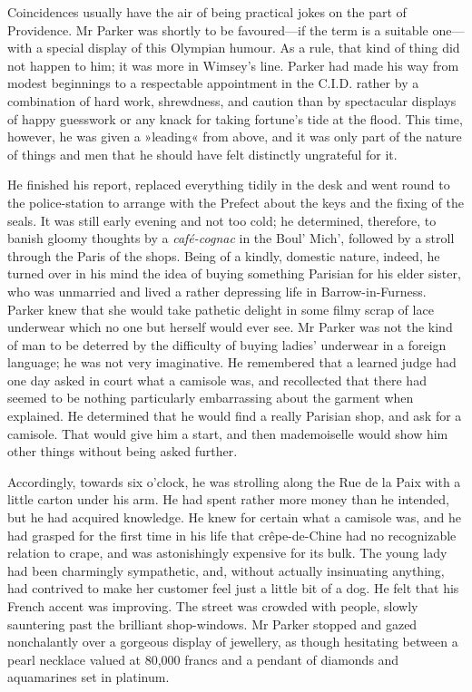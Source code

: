 Coincidences usually have the air of being practical jokes on the part of Providence. Mr Parker was shortly to be favoured\allowbreak---\allowbreak if the term is a suitable one\allowbreak---\allowbreak with a special display of this Olympian humour. As a rule, that kind of thing did not happen to him; it was more in Wimsey's line. Parker had made his way from modest beginnings to a respectable appointment in the C.I.D. rather by a combination of hard work, shrewdness, and caution than by spectacular displays of happy guesswork or any knack for taking fortune's tide at the flood. This time, however, he was given a »leading« from above, and it was only part of the nature of things and men that he should have felt distinctly ungrateful for it.

He finished his report, replaced everything tidily in the desk and went round to the police-station to arrange with the Prefect about the keys and the fixing of the seals. It was still early evening and not too cold; he determined, therefore, to banish gloomy thoughts by a \foreignlanguage{french}{\textit{café-cognac}} in the Boul' Mich', followed by a stroll through the Paris of the shops. Being of a kindly, domestic nature, indeed, he turned over in his mind the idea of buying something Parisian for his elder sister, who was unmarried and lived a rather depressing life in Barrow-in-Furness. Parker knew that she would take pathetic delight in some filmy scrap of lace underwear which no one but herself would ever see. Mr Parker was not the kind of man to be deterred by the difficulty of buying ladies' underwear in a foreign language; he was not very imaginative. He remembered that a learned judge had one day asked in court what a camisole was, and recollected that there had seemed to be nothing particularly embarrassing about the garment when explained. He determined that he would find a really Parisian shop, and ask for a camisole. That would give him a start, and then mademoiselle would show him other things without being asked further.

Accordingly, towards six o'clock, he was strolling along the Rue de la Paix with a little carton under his arm. He had spent rather more money than he intended, but he had acquired knowledge. He knew for certain what a camisole was, and he had grasped for the first time in his life that crêpe-de-Chine had no recognizable relation to crape, and was astonishingly expensive for its bulk. The young lady had been charmingly sympathetic, and, without actually insinuating anything, had contrived to make her customer feel just a little bit of a dog. He felt that his French accent was improving. The street was crowded with people, slowly sauntering past the brilliant shop-windows. Mr Parker stopped and gazed nonchalantly over a gorgeous display of jewellery, as though hesitating between a pearl necklace valued at 80,000 francs and a pendant of diamonds and aquamarines set in platinum.


